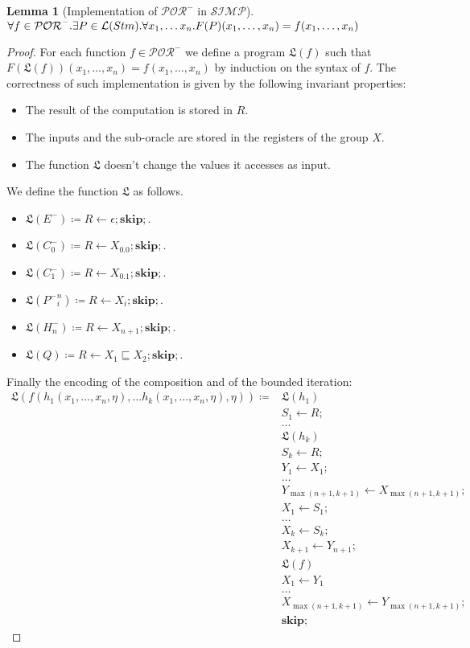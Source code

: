 \documentclass[10pt]{amsart}
\newcommand{\POR}{\mathcal{POR}}
\newcommand{\SIMP}{\mathcal{SIMP}}
\newcommand{\vone}{x}
\newcommand{\lang}[1]{\mathcal L(#1)}
\newcommand{\sk}{\mathbf{skip};}
\newcommand{\takes}{\leftarrow}
\newcommand{\LL}{\mathfrak L}
\newtheorem{lemma}{Lemma}
\begin{document}
\begin{lemma}[Implementation of $\POR^-$ in $\SIMP$]
\label{lemma:por-tosimp}
$\forall f \in \POR^-.\exists P\in \lang {Stm}.\\\forall \vone_1, \ldots \vone_n. F(P)(\vone_1, \ldots, \vone_n)=f(\vone_1, \ldots, \vone_n)$
\end{lemma}
\begin{proof}
For each function $f \in \POR^-$ we define a program $\LL(f)$ such that $F(\LL(f))(x_1, \ldots, x_n)=f(x_1, \ldots, x_n)$ by induction on the syntax of $f$. The correctness of such implementation is given by the following invariant properties:
\begin{itemize}
\item The result of the computation is stored in $R$.
\item The inputs and the sub-oracle are stored in the registers of the group $X$.
\item The function $\LL$ doesn't change the values it accesses as input.
\end{itemize}

We define the function $\LL$ as follows.
\begin{itemize}
\item $\LL(E^-)\coloneqq R \takes \epsilon; \sk$.
\item $\LL(C_0^-)\coloneqq R \takes X_0.0; \sk$.
\item $\LL(C_1^-)\coloneqq R \takes X_0.1; \sk$.
\item $\LL({P^-}^n_i)\coloneqq R \takes X_i; \sk$.
\item $\LL(H^-_n)\coloneqq R \takes X_{n+1}; \sk$.
\item $\LL(Q)\coloneqq R \takes X_1 \sqsubseteq X_2; \sk$.
\end{itemize}

Finally the encoding of the composition and of the bounded iteration:
\begin{align*}
\LL(f(h_1(\vone_1,\ldots, \vone_n, \eta), \ldots h_k(\vone_1,\ldots, \vone_n, \eta), \eta))\coloneqq& \LL(h_1)\\
&S_1 \takes R;\\
&\ldots\\
&\LL(h_k)\\
&S_k \takes R;\\
&Y_1 \takes X_1;\\
& \ldots\\
& Y_{\max(n+1, k+1)} \takes X_{\max(n+1, k+1)};\\
& X_1 \takes S_1;\\
& \ldots\\
& X_k \takes S_k;\\
& X_{k+1} \takes Y_{n+1};\\
&\LL(f)\\
& X_1 \takes Y_1\\
&\ldots\\
&X_{\max(n+1, k+1)} \takes Y_{\max(n+1, k+1)};\\
&\sk
\end{align*}


\end{proof}
\end{document}
